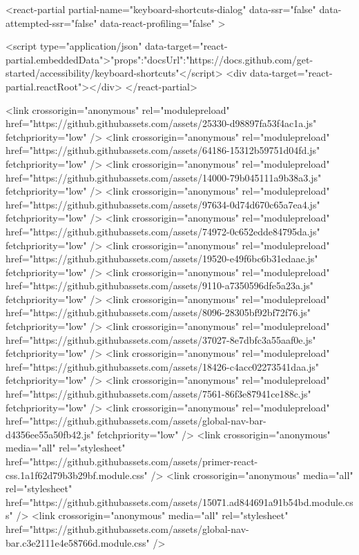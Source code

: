 <react-partial
  partial-name="keyboard-shortcuts-dialog"
  data-ssr="false"
  data-attempted-ssr="false"
  data-react-profiling="false"
>
  
  <script type="application/json" data-target="react-partial.embeddedData">{"props":{"docsUrl":"https://docs.github.com/get-started/accessibility/keyboard-shortcuts"}}</script>
  <div data-target="react-partial.reactRoot"></div>
</react-partial>





      

          

                  <link crossorigin="anonymous" rel="modulepreload" href="https://github.githubassets.com/assets/25330-d98897fa53f4ac1a.js" fetchpriority="low" />
<link crossorigin="anonymous" rel="modulepreload" href="https://github.githubassets.com/assets/64186-15312b59751d04fd.js" fetchpriority="low" />
<link crossorigin="anonymous" rel="modulepreload" href="https://github.githubassets.com/assets/14000-79b045111a9b38a3.js" fetchpriority="low" />
<link crossorigin="anonymous" rel="modulepreload" href="https://github.githubassets.com/assets/97634-0d74d670c65a7ea4.js" fetchpriority="low" />
<link crossorigin="anonymous" rel="modulepreload" href="https://github.githubassets.com/assets/74972-0c652edde84795da.js" fetchpriority="low" />
<link crossorigin="anonymous" rel="modulepreload" href="https://github.githubassets.com/assets/19520-e49f6bc6b31edaae.js" fetchpriority="low" />
<link crossorigin="anonymous" rel="modulepreload" href="https://github.githubassets.com/assets/9110-a7350596dfe5a23a.js" fetchpriority="low" />
<link crossorigin="anonymous" rel="modulepreload" href="https://github.githubassets.com/assets/8096-28305bf92bf72f76.js" fetchpriority="low" />
<link crossorigin="anonymous" rel="modulepreload" href="https://github.githubassets.com/assets/37027-8e7dbfc3a55aaf0e.js" fetchpriority="low" />
<link crossorigin="anonymous" rel="modulepreload" href="https://github.githubassets.com/assets/18426-c4acc02273541daa.js" fetchpriority="low" />
<link crossorigin="anonymous" rel="modulepreload" href="https://github.githubassets.com/assets/7561-86f3e87941ce188c.js" fetchpriority="low" />
<link crossorigin="anonymous" rel="modulepreload" href="https://github.githubassets.com/assets/global-nav-bar-d4356ee55a50fb42.js" fetchpriority="low" />
<link crossorigin="anonymous" media="all" rel="stylesheet" href="https://github.githubassets.com/assets/primer-react-css.1a1f62d79b3b29bf.module.css" />
<link crossorigin="anonymous" media="all" rel="stylesheet" href="https://github.githubassets.com/assets/15071.ad844691a91b54bd.module.css" />
<link crossorigin="anonymous" media="all" rel="stylesheet" href="https://github.githubassets.com/assets/global-nav-bar.c3e2111e4e58766d.module.css" />

